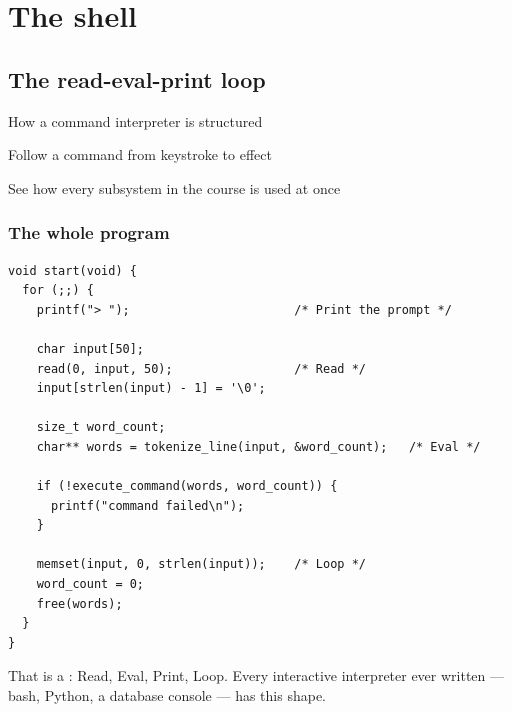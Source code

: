 \part{The shell}

\chapter{The read-eval-print loop}

\begin{goals}
  \item How a command interpreter is structured
  \item Follow a command from keystroke to effect
  \item See how every subsystem in the course is used at once
\end{goals}

\section{The whole program}

\begin{lstlisting}[style=c]
void start(void) {
  for (;;) {
    printf("> ");                       /* Print the prompt */

    char input[50];
    read(0, input, 50);                 /* Read */
    input[strlen(input) - 1] = '\0';

    size_t word_count;
    char** words = tokenize_line(input, &word_count);   /* Eval */

    if (!execute_command(words, word_count)) {
      printf("command failed\n");
    }

    memset(input, 0, strlen(input));    /* Loop */
    word_count = 0;
    free(words);
  }
}
\end{lstlisting}

That is a : Read, Eval, Print, Loop. Every interactive interpreter ever written --- bash,
Python, a database console --- has this shape.


